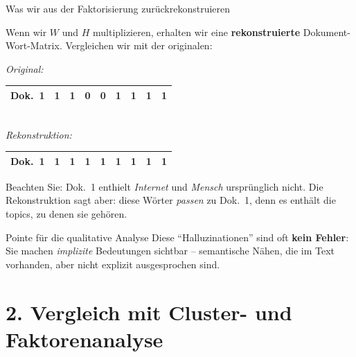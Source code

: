 \documentclass[aspectratio=169,11pt]{beamer}
\let\oldemph\emph
\renewcommand{\emph}[1]{{\color{solCyan}\oldemph{#1}}}
\let\oldtextbf\textbf
\renewcommand{\textbf}[1]{{\color{solBase3}\oldtextbf{#1}}}
\begin{document}
\begin{frame}{Was wir aus der Faktorisierung zurückrekonstruieren}

  Wenn wir $W$ und $H$ multiplizieren, erhalten wir eine
  \textbf{rekonstruierte} Dokument-Wort-Matrix.
  \vfill
  Vergleichen wir mit der originalen:
  \begin{center}
    \footnotesize
    \textit{Original:}\\[2pt]
    \begin{tabular}{@{}l|cccccccc@{}}
      \toprule
      Dok.\ 1 & 1 & 1 & 0 & 0 & 1 & 1 & 1 & 1 \\
      \bottomrule
    \end{tabular}
    \\[6pt]
    \textit{Rekonstruktion:}\\[2pt]
    \begin{tabular}{@{}l|cccccccc@{}}
      \toprule
      Dok.\ 1 & 1 & 1 & 1 & 1 & 1 & 1 & 1 & 1 \\
      \bottomrule
    \end{tabular}
  \end{center}

  \vfill
  Beachten Sie: Dok.\ 1 enthielt \emph{Internet} und \emph{Mensch}
  ursprünglich nicht. Die Rekonstruktion sagt aber: diese Wörter
  \emph{passen} zu Dok.\ 1, denn es enthält die topics, zu denen sie
  gehören.

  \begin{block}{Pointe für die qualitative Analyse}
    Diese \enquote{Halluzinationen} sind oft \textbf{kein Fehler}:
    Sie machen \emph{implizite} Bedeutungen sichtbar – semantische
    Nähen, die im Text vorhanden, aber nicht explizit ausgesprochen sind.
  \end{block}

\end{frame}

\section{2. Vergleich mit Cluster- und Faktorenanalyse}
\end{document}
